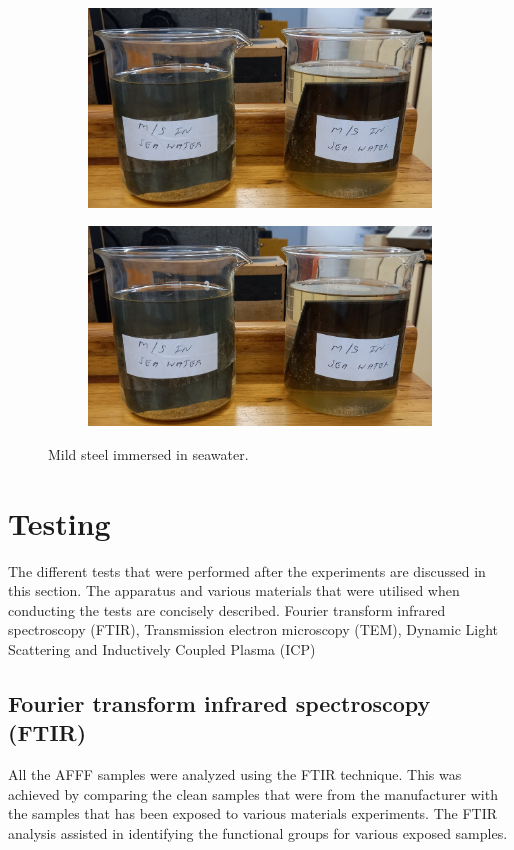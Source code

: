 \documentclass[12pt]{report}
\begin{document}
\begin{figure}[H]
\centering
\begin{subfigure}{\textwidth}
    \centering
    \includegraphics[width=.5\textwidth]{mild_steel_immersed_in_seawater.jpg}
\end{subfigure}
\par\medskip
\begin{subfigure}{\textwidth}
    \centering
    \includegraphics[width=.5\textwidth]{mild_steel_immersed_in_seawater.jpg}
\end{subfigure}

\caption{Mild steel immersed in seawater.}
\label{ch4:figure:steel_immersed}
\end{figure}

\section{Testing} 
The different tests that were performed after the experiments are discussed in this section. The apparatus and various materials that were utilised when conducting the tests are concisely described. 
Fourier transform infrared spectroscopy (FTIR), Transmission electron microscopy (TEM), Dynamic Light Scattering and Inductively Coupled Plasma (ICP)

\subsection{Fourier transform infrared spectroscopy (FTIR)}
All the AFFF samples were analyzed using the FTIR technique. This was achieved by comparing the clean samples that were from the manufacturer with the samples that has been exposed to various materials experiments. The FTIR analysis assisted in identifying the functional groups for various exposed samples.
 
\end{document}
